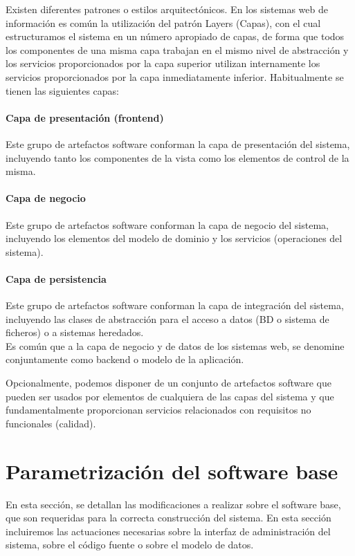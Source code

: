 Existen diferentes patrones o estilos arquitectónicos. En los sistemas web de información es común la utilización del patrón Layers (Capas), con el cual estructuramos el sistema en un número apropiado de capas, de forma que todos los componentes de una misma capa trabajan en el mismo nivel de abstracción y los servicios proporcionados por la capa superior utilizan internamente los servicios proporcionados por la capa inmediatamente inferior. Habitualmente se tienen las siguientes capas:

\paragraph*{Capa de presentación (frontend)}
Este grupo de artefactos software conforman la capa de presentación del sistema, incluyendo tanto los componentes de la vista como los elementos de control de la misma.

\paragraph*{Capa de negocio}
Este grupo de artefactos software conforman la capa de negocio del sistema, incluyendo los elementos del modelo de dominio y los servicios (operaciones del sistema).

\paragraph*{Capa de persistencia}
Este grupo de artefactos software conforman la capa de integración del sistema, incluyendo las clases de abstracción para el acceso a datos (BD o sistema de ficheros) o a sistemas heredados.\\

Es común que a la capa de negocio y de datos de los sistemas web, se denomine conjuntamente como backend o modelo de la aplicación.

Opcionalmente, podemos disponer de un conjunto de artefactos software que pueden ser usados por elementos de cualquiera de las capas del sistema y que fundamentalmente proporcionan servicios relacionados con requisitos no funcionales (calidad).

\section{Parametrización del software base}
En esta sección, se detallan las modificaciones a realizar sobre el software base, que son requeridas para la correcta construcción del sistema. En esta sección incluiremos las  actuaciones necesarias sobre la interfaz de administración del sistema, sobre el código fuente o sobre el modelo de datos.

